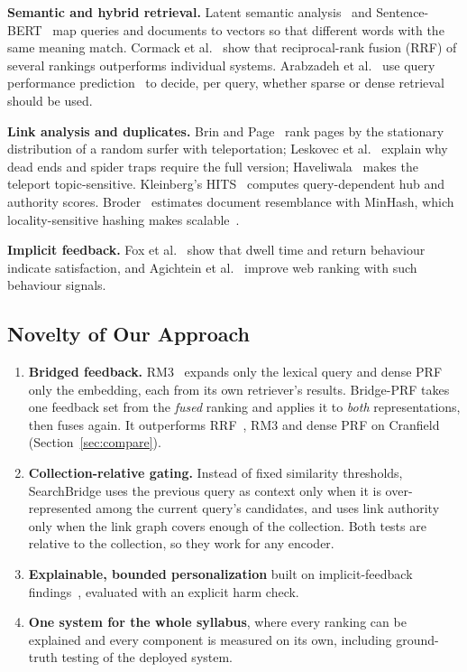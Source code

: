 \documentclass[conference]{IEEEtran}
\begin{document}
\textbf{Semantic and hybrid retrieval.} Latent semantic analysis~\cite{deerwester1990} and Sentence-BERT~\cite{reimers2019} map queries and documents to vectors so that different words with the same meaning match. Cormack et al.~\cite{cormack2009} show that reciprocal-rank fusion (RRF) of several rankings outperforms individual systems. Arabzadeh et al.~\cite{arabzadeh2021} use query performance prediction~\cite{shtok2012,zhou2007} to decide, per query, whether sparse or dense retrieval should be used.

\textbf{Link analysis and duplicates.} Brin and Page~\cite{brin1998} rank pages by the stationary distribution of a random surfer with teleportation; Leskovec et al.~\cite{leskovec2020} explain why dead ends and spider traps require the full version; Haveliwala~\cite{haveliwala2002} makes the teleport topic-sensitive. Kleinberg's HITS~\cite{kleinberg1999} computes query-dependent hub and authority scores. Broder~\cite{broder1997} estimates document resemblance with MinHash, which locality-sensitive hashing makes scalable~\cite{leskovec2020}.

\textbf{Implicit feedback.} Fox et al.~\cite{fox2005} show that dwell time and return behaviour indicate satisfaction, and Agichtein et al.~\cite{agichtein2006} improve web ranking with such behaviour signals.

\subsection{Novelty of Our Approach}
\begin{enumerate}
\item \textbf{Bridged feedback.} RM3~\cite{abduljaleel2004} expands only the lexical query and dense PRF~\cite{li2023} only the embedding, each from its own retriever's results. Bridge-PRF takes one feedback set from the \emph{fused} ranking and applies it to \emph{both} representations, then fuses again. It outperforms RRF~\cite{cormack2009}, RM3 and dense PRF on Cranfield (Section~\ref{sec:compare}).
\item \textbf{Collection-relative gating.} Instead of fixed similarity thresholds, SearchBridge uses the previous query as context only when it is over-represented among the current query's candidates, and uses link authority only when the link graph covers enough of the collection. Both tests are relative to the collection, so they work for any encoder.
\item \textbf{Explainable, bounded personalization} built on implicit-feedback findings~\cite{fox2005,agichtein2006}, evaluated with an explicit harm check.
\item \textbf{One system for the whole syllabus}, where every ranking can be explained and every component is measured on its own, including ground-truth testing of the deployed system.
\end{enumerate}
\end{document}
